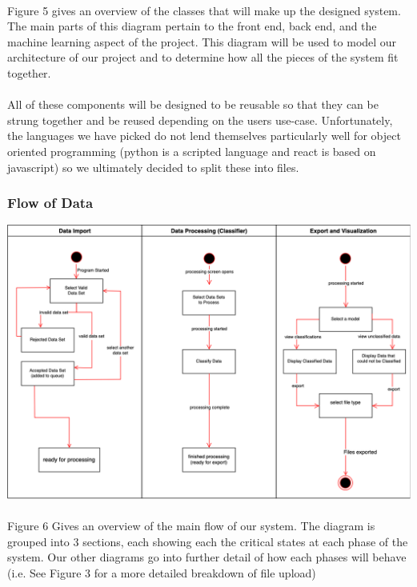 \documentclass[12pt,oneside,letterpaper]{article}
\begin{document}
\paragraph{}Figure 5 gives an overview of the classes that will make up the designed system. The main parts of this diagram pertain to the front end, back end, and the machine learning aspect of the project. This diagram will be used to model our architecture of our project and to determine how all the pieces of the system fit together. 
 \paragraph{} All of these components will be designed to be reusable so that they can be strung together and be reused depending on the users use-case. Unfortunately, the languages we have picked do not lend themselves particularly well for object oriented programming (python is a scripted language and react is based on javascript) so we ultimately decided to split these into files.
 
 \subsubsection{Flow of Data}
\includegraphics[scale = 0.40]{LandonStateDiagram.png}
\begingroup
{}
\endgroup

\paragraph{}Figure 6 Gives an overview of the main flow of our system. The diagram is grouped into 3 sections, each showing each the critical states at each phase of the system. Our other diagrams go into further detail of how each phases will behave (i.e. See Figure 3 for a more detailed breakdown of file upload)
\end{document}
